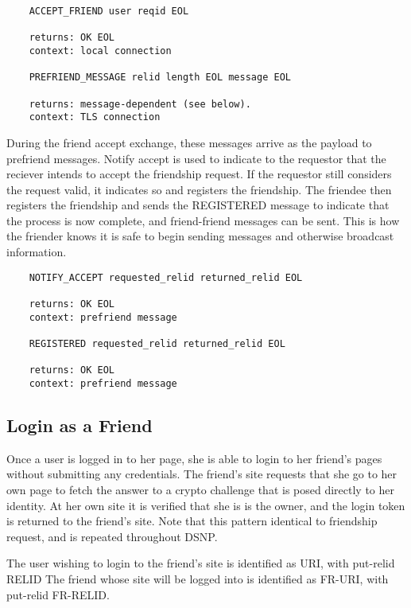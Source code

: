 \documentclass[letterpaper,11pt,oneside]{article}
\begin{document}
\vspace{10pt}
\begin{verbatim}
    ACCEPT_FRIEND user reqid EOL

    returns: OK EOL
    context: local connection

    PREFRIEND_MESSAGE relid length EOL message EOL

    returns: message-dependent (see below).
    context: TLS connection
\end{verbatim}
\vspace{10pt}

During the friend accept exchange, these messages arrive as the payload to
prefriend messages. Notify accept is used to indicate to the requestor that the
reciever intends to accept the friendship request. If the requestor still
considers the request valid, it indicates so and registers the friendship. The
friendee then registers the friendship and sends the REGISTERED message to
indicate that the process is now complete, and friend-friend messages can be
sent. This is how the friender knows it is safe to begin sending messages and
otherwise broadcast information.

\vspace{10pt}
\begin{verbatim}
    NOTIFY_ACCEPT requested_relid returned_relid EOL

    returns: OK EOL
    context: prefriend message

    REGISTERED requested_relid returned_relid EOL

    returns: OK EOL
    context: prefriend message
\end{verbatim}

\subsection{Login as a Friend}

Once a user is logged in to her page, she is able to login to her friend's
pages without submitting any credentials. The friend's site requests that she
go to her own page to fetch the answer to a crypto challenge that is posed
directly to her identity. At her own site it is verified that she is is the
owner, and the login token is returned to the friend's site. Note that this
pattern identical to friendship request, and is repeated throughout DSNP.

The user wishing to login to the friend's site is identified as URI, with
put-relid RELID The friend whose site will be logged into is identified as
FR-URI, with put-relid FR-RELID.
\end{document}
